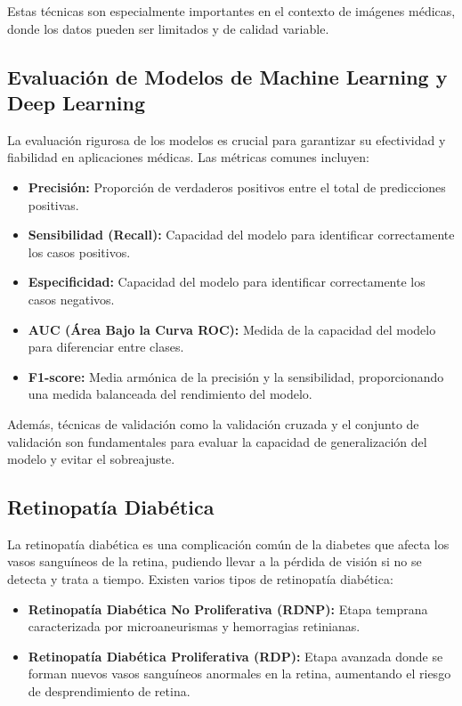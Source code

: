Estas técnicas son especialmente importantes en el contexto de imágenes médicas, donde los datos pueden ser limitados y de calidad variable.

\subsection{Evaluación de Modelos de Machine Learning y Deep Learning}

La evaluación rigurosa de los modelos es crucial para garantizar su efectividad y fiabilidad en aplicaciones médicas. Las métricas comunes incluyen:

\begin{itemize}
 \item \textbf{Precisión:} Proporción de verdaderos positivos entre el total de predicciones positivas.
 \item \textbf{Sensibilidad (Recall):} Capacidad del modelo para identificar correctamente los casos positivos.
 \item \textbf{Especificidad:} Capacidad del modelo para identificar correctamente los casos negativos.
 \item \textbf{AUC (Área Bajo la Curva ROC):} Medida de la capacidad del modelo para diferenciar entre clases.
 \item \textbf{F1-score:} Media armónica de la precisión y la sensibilidad, proporcionando una medida balanceada del rendimiento del modelo.
\end{itemize}

Además, técnicas de validación como la validación cruzada y el conjunto de validación son fundamentales para evaluar la capacidad de generalización del modelo y evitar el sobreajuste.

\subsection{Retinopatía Diabética}

La retinopatía diabética es una complicación común de la diabetes que afecta los vasos sanguíneos de la retina, pudiendo llevar a la pérdida de visión si no se detecta y trata a tiempo. Existen varios tipos de retinopatía diabética:

\begin{itemize}
 \item \textbf{Retinopatía Diabética No Proliferativa (RDNP):} Etapa temprana caracterizada por microaneurismas y hemorragias retinianas.
 \item \textbf{Retinopatía Diabética Proliferativa (RDP):} Etapa avanzada donde se forman nuevos vasos sanguíneos anormales en la retina, aumentando el riesgo de desprendimiento de retina.
\end{itemize}

